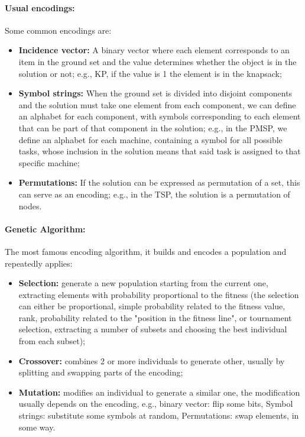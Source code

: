 \documentclass{article}
\begin{document}
	\paragraph{Usual encodings:} Some common encodings are:
	\begin{itemize}
		\item \textbf{Incidence vector:} A binary vector where each element corresponds to an item in the ground set and the value determines whether the object is in the solution or not; e.g., KP, if the value is 1 the element is in the knapsack;
		\item \textbf{Symbol strings:} When the ground set is divided into disjoint components and the solution must take one element from each component, we can define an alphabet for each component, with symbols corresponding to each element that can be part of that component in the solution; e.g., in the PMSP, we define an alphabet for each machine, containing a symbol for all possible tasks, whose inclusion in the solution means that said task is assigned to that specific machine;
		\item \textbf{Permutations:} If the solution can be expressed as permutation of a set, this can serve as an encoding; e.g., in the TSP, the solution is a permutation of nodes.\\
	\end{itemize}
	
	\paragraph{Genetic Algorithm:} The most famous encoding algorithm, it builds and encodes a population and repeatedly applies: 
	\begin{itemize}
		\item \textbf{Selection:} generate a new population starting from the current one, extracting elements with probability proportional to the fitness (the selection can either be proportional, simple probability related to the fitness value, rank, probability related to the "position in the fitness line", or tournament selection, extracting a number of subsets and choosing the best individual from each subset);
		\item \textbf{Crossover:} combines 2 or more individuals to generate other, usually by splitting and swapping parts of the encoding;
		\item \textbf{Mutation:} modifies an individual to generate a similar one, the modification usually depends on the encoding, e.g., binary vector: flip some bits, Symbol strings: substitute some symbols at random, Permutations: swap elements, in some way. \\
	\end{itemize}
	
\end{document}
